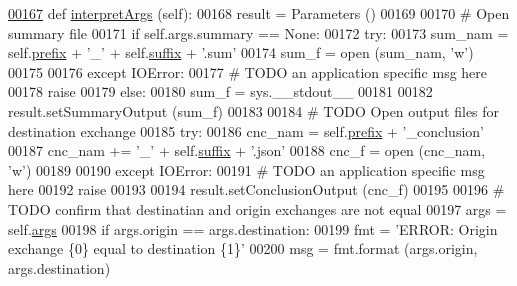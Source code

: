 \begin{DoxyCode}
\hypertarget{classe2e_1_1_application.tex_l00167}{}\hyperlink{classe2e_1_1_application_ae7b9559aa388f8178300fb4d7a9f9257}{00167}     \textcolor{keyword}{def }\hyperlink{classe2e_1_1_application_ae7b9559aa388f8178300fb4d7a9f9257}{interpretArgs} (self):
00168         result = Parameters ()
00169         
00170         \textcolor{comment}{# Open summary file}
00171         \textcolor{keywordflow}{if} self.args.summary == \textcolor{keywordtype}{None}:
00172             \textcolor{keywordflow}{try}:
00173                 sum\_nam =  self.\hyperlink{classe2e_1_1_application_a027ff25e5409ae17584978a09fc2611a}{prefix} + \textcolor{stringliteral}{'\_'} + self.\hyperlink{classe2e_1_1_application_a4d824ad36b051d2d629edb314385df0d}{suffix} + \textcolor{stringliteral}{'.sum'}
00174                 sum\_f = open (sum\_nam, \textcolor{stringliteral}{'w'})
00175                 
00176             \textcolor{keywordflow}{except} IOError:
00177                 \textcolor{comment}{# TODO an application specific msg here}
00178                 \textcolor{keywordflow}{raise}
00179         \textcolor{keywordflow}{else}:
00180             sum\_f = sys.\_\_stdout\_\_
00181             
00182         result.setSummaryOutput (sum\_f)
00183             
00184         \textcolor{comment}{# TODO Open output files for destination exchange}
00185         \textcolor{keywordflow}{try}:
00186             cnc\_nam  =  self.\hyperlink{classe2e_1_1_application_a027ff25e5409ae17584978a09fc2611a}{prefix} + \textcolor{stringliteral}{'\_conclusion'}
00187             cnc\_nam += \textcolor{stringliteral}{'\_'} + self.\hyperlink{classe2e_1_1_application_a4d824ad36b051d2d629edb314385df0d}{suffix} + \textcolor{stringliteral}{'.json'}
00188             cnc\_f = open (cnc\_nam, \textcolor{stringliteral}{'w'})
00189             
00190         \textcolor{keywordflow}{except} IOError:
00191             \textcolor{comment}{# TODO an application specific msg here}
00192             \textcolor{keywordflow}{raise}
00193             
00194         result.setConclusionOutput (cnc\_f)
00195             
00196         \textcolor{comment}{# TODO confirm that destinatian and origin exchanges are not equal}
00197         args = self.\hyperlink{classe2e_1_1_application_abade6fc2e2c04ddd7e48137a2a7721bd}{args} 
00198         \textcolor{keywordflow}{if} args.origin == args.destination:
00199             fmt = \textcolor{stringliteral}{'ERROR: Origin exchange \{0\} equal to destination \{1\}'}
00200             msg = fmt.format (args.origin, args.destination)

\end{DoxyCode}
